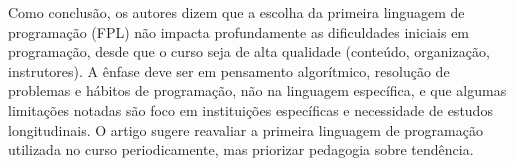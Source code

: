 \documentclass[12pt,a4paper,oneside]{abntex2}
\begin{document}
Como conclusão, os autores dizem que a escolha da primeira linguagem de programação (FPL) não impacta profundamente as dificuldades iniciais em programação, desde que o curso seja de alta qualidade (conteúdo, organização, instrutores). A ênfase deve ser em pensamento algorítmico, resolução de problemas e hábitos de programação, não na linguagem específica, e que algumas limitações notadas são foco em instituições específicas e necessidade de estudos longitudinais. O artigo sugere reavaliar a primeira linguagem de programação utilizada no curso periodicamente, mas priorizar pedagogia sobre tendência.
\end{document}

